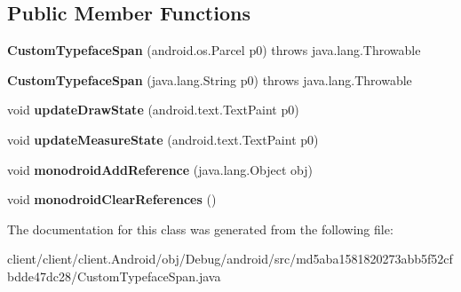\subsection*{Public Member Functions}
\begin{DoxyCompactItemize}
\item 
\hypertarget{classmd5aba1581820273abb5f52cfbdde47dc28_1_1CustomTypefaceSpan_afb48296b81d3db7357a430b4f3723b09}{}{\bfseries Custom\+Typeface\+Span} (android.\+os.\+Parcel p0)  throws java.\+lang.\+Throwable 	\label{classmd5aba1581820273abb5f52cfbdde47dc28_1_1CustomTypefaceSpan_afb48296b81d3db7357a430b4f3723b09}

\item 
\hypertarget{classmd5aba1581820273abb5f52cfbdde47dc28_1_1CustomTypefaceSpan_ae32c382f9da3359fa4e363b2a3f439e7}{}{\bfseries Custom\+Typeface\+Span} (java.\+lang.\+String p0)  throws java.\+lang.\+Throwable 	\label{classmd5aba1581820273abb5f52cfbdde47dc28_1_1CustomTypefaceSpan_ae32c382f9da3359fa4e363b2a3f439e7}

\item 
\hypertarget{classmd5aba1581820273abb5f52cfbdde47dc28_1_1CustomTypefaceSpan_a17e8e3118f4dec1a306c65021849277c}{}void {\bfseries update\+Draw\+State} (android.\+text.\+Text\+Paint p0)\label{classmd5aba1581820273abb5f52cfbdde47dc28_1_1CustomTypefaceSpan_a17e8e3118f4dec1a306c65021849277c}

\item 
\hypertarget{classmd5aba1581820273abb5f52cfbdde47dc28_1_1CustomTypefaceSpan_ab3d49d2412696025388baea5a95bac88}{}void {\bfseries update\+Measure\+State} (android.\+text.\+Text\+Paint p0)\label{classmd5aba1581820273abb5f52cfbdde47dc28_1_1CustomTypefaceSpan_ab3d49d2412696025388baea5a95bac88}

\item 
\hypertarget{classmd5aba1581820273abb5f52cfbdde47dc28_1_1CustomTypefaceSpan_a27c9e9a5527e86d77c3f9289afaba78c}{}void {\bfseries monodroid\+Add\+Reference} (java.\+lang.\+Object obj)\label{classmd5aba1581820273abb5f52cfbdde47dc28_1_1CustomTypefaceSpan_a27c9e9a5527e86d77c3f9289afaba78c}

\item 
\hypertarget{classmd5aba1581820273abb5f52cfbdde47dc28_1_1CustomTypefaceSpan_adacf2b449c3fb2140b9e5b94c56c1575}{}void {\bfseries monodroid\+Clear\+References} ()\label{classmd5aba1581820273abb5f52cfbdde47dc28_1_1CustomTypefaceSpan_adacf2b449c3fb2140b9e5b94c56c1575}

\end{DoxyCompactItemize}


The documentation for this class was generated from the following file\+:\begin{DoxyCompactItemize}
\item 
client/client/client.\+Android/obj/\+Debug/android/src/md5aba1581820273abb5f52cfbdde47dc28/Custom\+Typeface\+Span.\+java\end{DoxyCompactItemize}
